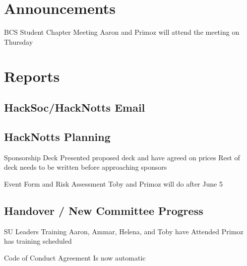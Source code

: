 \documentclass[11pt,hacksoc]{meetingmins}
\begin{document}
\maketitle

\section{Announcements}
\begin{items}
\item
BCS Student Chapter Meeting
\subitem
Aaron and Primoz will attend the meeting on Thursday

\end{items}

\section{Reports}

\subsection{HackSoc/HackNotts Email}

\subsection{HackNotts Planning}
\begin{hiddensubitems}
\item
Sponsorship Deck
\subitem
Presented proposed deck and have agreed on prices
\subitem
Rest of deck needs to be written before approaching sponsors

\item
Event Form and Risk Assessment
\subitem
Toby and Primoz will do after June 5

\end{hiddensubitems}

\subsection{Handover / New Committee Progress}
\begin{hiddensubitems}

\item
SU Leaders Training
\subitem
Aaron, Ammar, Helena, and Toby have Attended
\subitem
Primoz has training scheduled

\item
Code of Conduct Agreement
\subitem
Is now automatic
	
\end{hiddensubitems}
\end{document}
